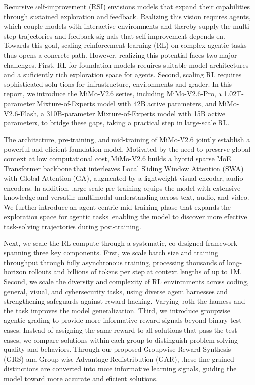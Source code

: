 \documentclass[
  10
]{article}
\begin{document}
Recursive self-improvement (RSI) envisions models that expand their
capabilities through sustained exploration and feedback. Realizing this
vision requires agents, which couple models with interactive
environments and thereby supply the multi-step trajectories and feedback
sig nals that self-improvement depends on. Towards this goal, scaling
reinforcement learning (RL) on complex agentic tasks thus opens a
concrete path. However, realizing this potential faces two major
challenges. First, RL for foundation models requires suitable model
architectures and a suficiently rich exploration space for agents.
Second, scaling RL requires sophisticated solu tions for infrastructure,
environments and grader. In this report, we introduce the MiMo-V2.6
series, including MiMo-V2.6-Pro, a 1.02T-parameter Mixture-of-Experts
model with 42B active parameters, and MiMo-V2.6-Flash, a 310B-parameter
Mixture-of-Experts model with 15B active parameters, to bridge these
gaps, taking a practical step in large-scale RL.

The architecture, pre-training, and mid-training of MiMo-V2.6 jointly
establish a powerful and eficient foundation model. Motivated by the
need to preserve global context at low computational cost, MiMo-V2.6
builds a hybrid sparse MoE Transformer backbone that interleaves Local
Sliding Window Attention (SWA) with Global Attention (GA), augmented by
a lightweight visual encoder, audio encoders. In addition, large-scale
pre-training equips the model with extensive knowledge and versatile
multimodal understanding across text, audio, and video. We further
introduce an agent-centric mid-training phase that expands the
exploration space for agentic tasks, enabling the model to discover more
efective task-solving trajectories during post-training.

Next, we scale the RL compute through a systematic, co-designed
framework spanning three key components. First, we scale batch size and
training throughput through fully asynchronous training, processing
thousands of long-horizon rollouts and billions of tokens per step at
context lengths of up to 1M. Second, we scale the diversity and
complexity of RL environments across coding, general, visual, and
cybersecurity tasks, using diverse agent harnesses and strengthening
safeguards against reward hacking. Varying both the harness and the task
improves the model generalization. Third, we introduce groupwise agentic
grading to provide more informative reward signals beyond binary test
cases. Instead of assigning the same reward to all solutions that pass
the test cases, we compare solutions within each group to distinguish
problem-solving quality and behaviors. Through our proposed Groupwise
Reward Synthesis (GRS) and Group wise Advantage Redistribution (GAR),
these fine-grained distinctions are converted into more informative
learning signals, guiding the model toward more accurate and eficient
solutions.
\end{document}
